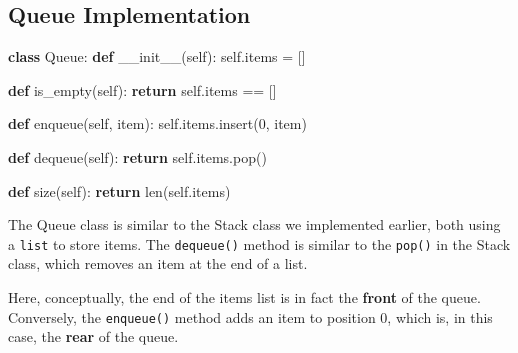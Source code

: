 \documentclass[
  letterpaper,
]{scrbook}
\newenvironment{Shaded}{\begin{snugshade}}{\end{snugshade}}
\newcommand{\BuiltInTok}[1]{\textcolor[rgb]{0.00,0.23,0.31}{#1}}
\newcommand{\ControlFlowTok}[1]{\textcolor[rgb]{0.00,0.23,0.31}{\textbf{#1}}}
\newcommand{\DecValTok}[1]{\textcolor[rgb]{0.68,0.00,0.00}{#1}}
\newcommand{\FunctionTok}[1]{\textcolor[rgb]{0.28,0.35,0.67}{#1}}
\newcommand{\KeywordTok}[1]{\textcolor[rgb]{0.00,0.23,0.31}{\textbf{#1}}}
\newcommand{\NormalTok}[1]{\textcolor[rgb]{0.00,0.23,0.31}{#1}}
\newcommand{\OperatorTok}[1]{\textcolor[rgb]{0.37,0.37,0.37}{#1}}
\newcommand{\VariableTok}[1]{\textcolor[rgb]{0.07,0.07,0.07}{#1}}
\begin{document}
\subsection*{Queue Implementation}\label{queue-implementation}

\begin{Shaded}
\begin{Highlighting}[]
\KeywordTok{class}\NormalTok{ Queue:}
    \KeywordTok{def} \FunctionTok{\_\_init\_\_}\NormalTok{(}\VariableTok{self}\NormalTok{):}
        \VariableTok{self}\NormalTok{.items }\OperatorTok{=}\NormalTok{ []}
        
    \KeywordTok{def}\NormalTok{ is\_empty(}\VariableTok{self}\NormalTok{):}
        \ControlFlowTok{return} \VariableTok{self}\NormalTok{.items }\OperatorTok{==}\NormalTok{ []}
    
    \KeywordTok{def}\NormalTok{ enqueue(}\VariableTok{self}\NormalTok{, item):}
        \VariableTok{self}\NormalTok{.items.insert(}\DecValTok{0}\NormalTok{, item)}
    
    \KeywordTok{def}\NormalTok{ dequeue(}\VariableTok{self}\NormalTok{):}
        \ControlFlowTok{return} \VariableTok{self}\NormalTok{.items.pop()}
    
    \KeywordTok{def}\NormalTok{ size(}\VariableTok{self}\NormalTok{):}
        \ControlFlowTok{return} \BuiltInTok{len}\NormalTok{(}\VariableTok{self}\NormalTok{.items)}
\end{Highlighting}
\end{Shaded}

The Queue class is similar to the Stack class we implemented earlier,
both using a \texttt{list} to store items. The \texttt{dequeue()} method
is similar to the \texttt{pop()} in the Stack class, which removes an
item at the end of a list.

Here, conceptually, the end of the items list is in fact the
\textbf{front} of the queue. Conversely, the \texttt{enqueue()} method
adds an item to position 0, which is, in this case, the \textbf{rear} of
the queue.
\end{document}
